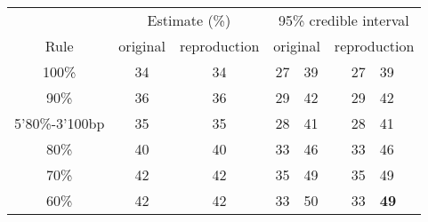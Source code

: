 \begin{tabular}{cccr@{--}lr@{--}l}
  \hline
  & \multicolumn{2}{c}{Estimate (\%)} & \multicolumn{4}{c}{95\% credible interval}\\ Rule & original & reproduction & \multicolumn{2}{c}{original} & \multicolumn{2}{c}{reproduction}\\ \hline
100\% & 34 & 34 & 27 & 39 & 27 & 39 \\ 
  90\% & 36 & 36 & 29 & 42 & 29 & 42 \\ 
  5'80\%-3'100bp & 35 & 35 & 28 & 41 & 28 & 41 \\ 
  80\% & 40 & 40 & 33 & 46 & 33 & 46 \\ 
  70\% & 42 & 42 & 35 & 49 & 35 & 49 \\ 
  60\% & 42 & 42 & 33 & 50 & 33 & \textbf{\color{red} 49} \\ 
   \hline
\end{tabular}
